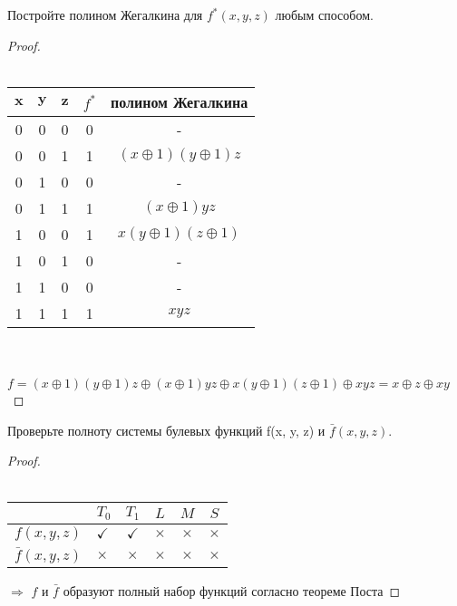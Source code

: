 \begin{problem}
     Постройте полином Жегалкина для $f^*(x,y,z)$ любым способом.
\end{problem}

\begin{proof} $ $ \\\\
    \begin{tabular}{|c|c|c|c|c|}
        \hline $\mathbf{x}$ & $\mathbf{y}$ & $\mathbf{z}$ & $f^*$ & полином Жегалкина \\
        \hline 0 & 0 & 0 & 0 & - \\
        \hline 0 & 0 & 1 & \cellcolor{green!15} 1 & $(x \oplus 1)(y \oplus 1) z$ \\
        \hline 0 & 1 & 0 & 0 & - \\
        \hline 0 & 1 & 1 & \cellcolor{green!15} 1 & $(x \oplus 1)yz$ \\
        \hline 1 & 0 & 0 & \cellcolor{green!15} 1 & $x(y \oplus 1)(z \oplus 1)$ \\
        \hline 1 & 0 & 1 & 0 & - \\
        \hline 1 & 1 & 0 & 0 & - \\
        \hline 1 & 1 & 1 & \cellcolor{green!15} 1 & $xyz$ \\
        \hline
    \end{tabular}\\\\
    $f=(x \oplus 1)(y \oplus 1)z \oplus (x \oplus 1)yz \oplus x(y \oplus 1)(z \oplus 1) \oplus xyz=x \oplus z \oplus xy$
\end{proof}

\begin{problem}
     Проверьте полноту системы булевых функций f(x, y, z) и $\bar{f}(x,y,z)$.
\end{problem}

\begin{proof} $ $\\\\
    \begin{tabular}{l|l|c|c|c|c} 
        & $T_0$ & $T_1$ & $L$ & $M$ & $S$ \\
        \hline
        $f(x, y, z)$ & $\checkmark$ & $\checkmark$ & $\times$ & $\times$ & $\times$ \\
        
        $\bar{f}(x, y, z)$ & $\times$ & $\times$ & $\times$ & $\times$ & $\times$
    \end{tabular}
    $\Rightarrow$ $f$ и $\bar{f}$ образуют полный набор функций согласно теореме Поста
\end{proof}


